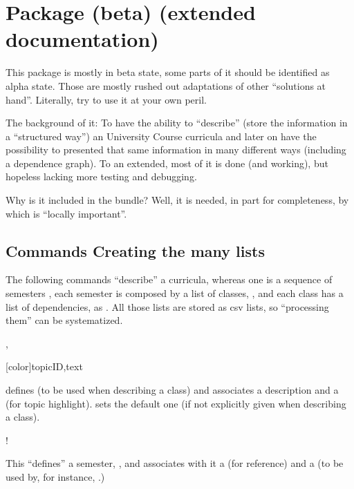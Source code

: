 \documentclass[dctools,english]{ufrgscca} %
\begin{document}
\section{ Package (beta) (extended documentation)}
This package is mostly in beta state, some parts of it should be identified as  alpha state. Those are mostly rushed out adaptations of other “solutions at hand”. Literally, try to use it at your own peril.

The background of it: To have the ability to “describe” (store the information in a “structured way”) an University Course curricula and later on have the possibility to presented that same information in many different ways (including a dependence graph). To an extended, most of it is done (and working), but hopeless lacking more testing and debugging.

Why is it included in the bundle? Well, it is needed, in part for completeness, by  which is “locally important”.

\subsection{Commands Creating the many lists}
The following commands “describe” a curricula, whereas one is a sequence of semesters , each semester is composed by a list of classes, , and each class has a list of dependencies,  as \Macro{\depdef}{}. All those lists are stored as csv lists, so “processing them” can be systematized.

\begin{Macros}{\topicdef,}
\begin{Syntax}%
    \Macro{\topicdef}[color]{topicID,text}
\end{Syntax}
\Macro{\topicdef}{} defines  (to be used when describing a class) and associates a  description and a  (for topic highlight).  sets the default one (if not explicitly given when describing a class).
\end{Macros}


\begin{Macros}{\semdef}
    \begin{Syntax}%
        \Macro!{\semdef}{}
    \end{Syntax}
This “defines” a semester, , and associates with it a  (for reference) and a  (to be used by, for instance, .)
\end{Macros}
\end{document}
